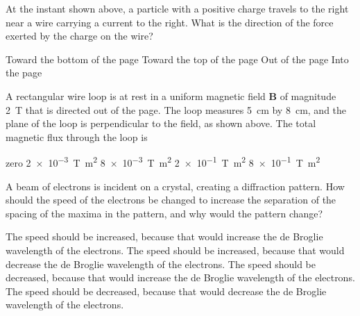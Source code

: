 \documentclass[12pt]{exam}
\begin{document}
\begin{questions}
  \question At the instant shown above, a particle with a positive charge
  travels to the right near a wire carrying a current to the right. What is the
  direction of the force exerted by the charge on the wire?
  \begin{choices}
    \choice Toward the bottom of the page
    \choice Toward the top of the page
    \choice Out of the page
    \choice Into the page
  \end{choices}


  \question A rectangular wire loop is at rest in a uniform magnetic field
  $\bm{B}$ of magnitude \SI{2}{\tesla} that is directed out of the page. The
  loop measures \SI{5}{\centi\metre} by \SI{8}{\centi\metre}, and the plane of
  the loop is perpendicular to the field, as shown above. The total magnetic
  flux through the loop is
  \begin{choices}
    \choice zero
    \choice \SI{2e-3}{\tesla.\metre\squared}
    \choice \SI{8e-3}{\tesla.\metre\squared}
    \choice \SI{2e-1}{\tesla.\metre\squared}
    \choice \SI{8e-1}{\tesla.\metre\squared}
  \end{choices}
  
  \question A beam of electrons is incident on a crystal, creating a
  diffraction pattern. How should the speed of the electrons be changed to
  increase the separation of the spacing of the maxima in the pattern, and why
  would the pattern change?
  \begin{choices}
    \choice The speed should be increased, because that would increase the de
    Broglie wavelength of the electrons.
    \choice The speed should be increased, because that would decrease the de
    Broglie wavelength of the electrons.
    \choice The speed should be decreased, because that would increase the de
    Broglie wavelength of the electrons.
    \choice The speed should be decreased, because that would decrease the de
    Broglie wavelength of the electrons.
  \end{choices}
  \vspace{.7in}
  

\end{questions}
\end{document}

